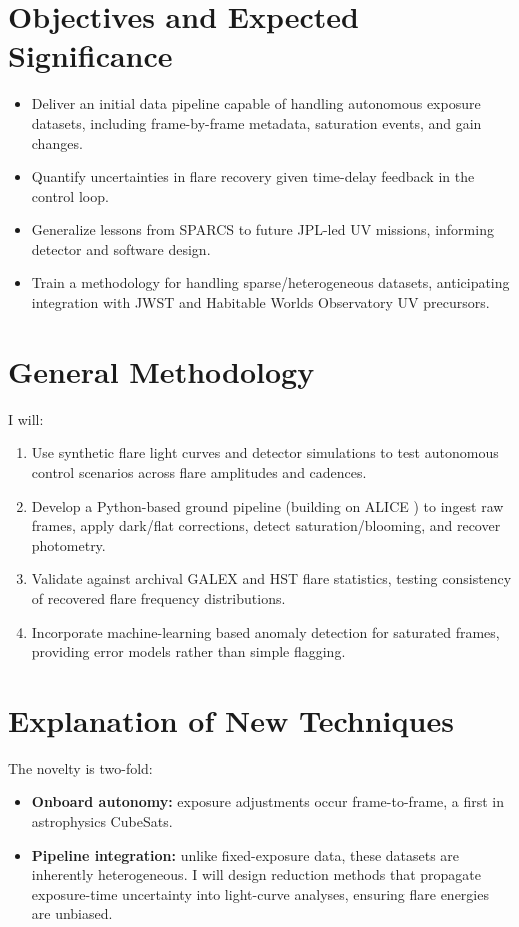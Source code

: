 \documentclass[final,letterpaper,oneside,12pt]{article}
\begin{document}
\section{Objectives and Expected Significance}
\begin{itemize}
    \item Deliver an initial data pipeline capable of handling autonomous exposure datasets, including frame-by-frame metadata, saturation events, and gain changes.
    \item Quantify uncertainties in flare recovery given time-delay feedback in the control loop.
    \item Generalize lessons from SPARCS to future JPL-led UV missions, informing detector and software design.
    \item Train a methodology for handling sparse/heterogeneous datasets, anticipating integration with JWST and Habitable Worlds Observatory UV precursors.
\end{itemize}

\section{General Methodology}
I will:
\begin{enumerate}
    \item Use synthetic flare light curves and detector simulations \citep{Ramiaramanantsoa2021} to test autonomous control scenarios across flare amplitudes and cadences.
    \item Develop a Python-based ground pipeline (building on ALICE \citep{Ramiaramanantsoa2025}) to ingest raw frames, apply dark/flat corrections, detect saturation/blooming, and recover photometry.
    \item Validate against archival GALEX and HST flare statistics, testing consistency of recovered flare frequency distributions.
    \item Incorporate machine-learning based anomaly detection for saturated frames, providing error models rather than simple flagging.
\end{enumerate}

\section{Explanation of New Techniques}
The novelty is two-fold:
\begin{itemize}
    \item \textbf{Onboard autonomy:} exposure adjustments occur frame-to-frame, a first in astrophysics CubeSats.
    \item \textbf{Pipeline integration:} unlike fixed-exposure data, these datasets are inherently heterogeneous. I will design reduction methods that propagate exposure-time uncertainty into light-curve analyses, ensuring flare energies are unbiased.
\end{itemize}
\end{document}
